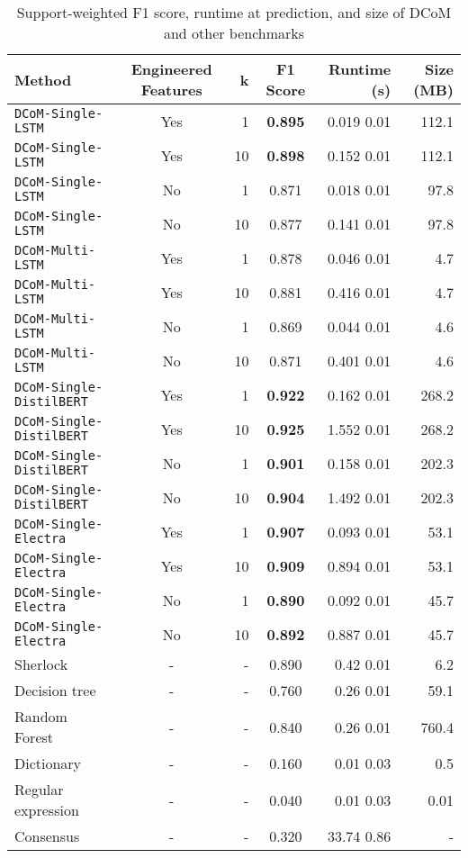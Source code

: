 \documentclass{article}
\begin{document}
\begin{table}[htp]
	\centering
	\begin{tabular}{lcrcrr}
		\hline
		\textbf{Method} & \textbf{Engineered Features} & \textbf{k} & \textbf{F1 Score} & \textbf{Runtime (s)} & \textbf{Size (MB)} \\
		\hline
		 \texttt{DCoM-Single-LSTM} & Yes & 1 & \textbf{0.895} & 0.019  0.01 & 112.1\\
		 \texttt{DCoM-Single-LSTM} & Yes & 10 & \textbf{0.898} & 0.152  0.01 & 112.1\\
		 \texttt{DCoM-Single-LSTM} & No & 1 & 0.871 & 0.018  0.01 & 97.8\\
		 \texttt{DCoM-Single-LSTM} & No & 10 & 0.877 & 0.141  0.01 & 97.8\\
		 \texttt{DCoM-Multi-LSTM} & Yes & 1 & 0.878 & 0.046  0.01 & 4.7\\
		 \texttt{DCoM-Multi-LSTM} & Yes & 10 & 0.881 & 0.416  0.01 & 4.7\\
		 \texttt{DCoM-Multi-LSTM} & No & 1 & 0.869 & 0.044  0.01 & 4.6\\
		 \texttt{DCoM-Multi-LSTM} & No & 10 & 0.871 & 0.401  0.01 & 4.6\\
		 \texttt{DCoM-Single-DistilBERT} & Yes & 1 & \textbf{0.922} & 0.162  0.01 & 268.2\\
		 \texttt{DCoM-Single-DistilBERT} & Yes & 10 & \textbf{0.925} & 1.552  0.01 & 268.2\\
		 \texttt{DCoM-Single-DistilBERT} & No & 1 & \textbf{0.901} & 0.158  0.01 & 202.3\\
		 \texttt{DCoM-Single-DistilBERT} & No & 10 & \textbf{0.904} & 1.492  0.01 & 202.3\\
		 \texttt{DCoM-Single-Electra} & Yes & 1 & \textbf{0.907} & 0.093  0.01 & 53.1\\
		 \texttt{DCoM-Single-Electra} & Yes & 10 & \textbf{0.909} & 0.894  0.01 & 53.1\\
		 \texttt{DCoM-Single-Electra} & No & 1 & \textbf{0.890} & 0.092  0.01 & 45.7\\
		 \texttt{DCoM-Single-Electra} & No & 10 & \textbf{0.892} & 0.887  0.01 & 45.7\\
		 \hline
		 Sherlock\cite{Hulsebos} & - & - & 0.890 & 0.42  0.01 & 6.2 \\
		 Decision tree\cite{Hulsebos} & - & - & 0.760 &  0.26  0.01 &  59.1 \\
		 Random Forest\cite{Hulsebos} & - & - & 0.840 &  0.26  0.01 &  760.4 \\
		 Dictionary\cite{Hulsebos} & - & - & 0.160 &  0.01  0.03 &  0.5 \\
		 Regular expression\cite{Hulsebos} & - & - & 0.040 &  0.01  0.03 &  0.01 \\
		 Consensus\cite{Hulsebos} & - & - & 0.320 &  33.74  0.86 &  - \\
		\hline
	\end{tabular}
	\caption{Support-weighted F1 score, runtime at prediction, and size of DCoM and other benchmarks}
	\label{tab:results}
\end{table}
\end{document}

